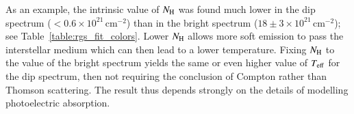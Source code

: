 \documentclass{aa}
\begin{document}
As an example, the intrinsic value of $N_{\rm H}$ was found much lower
in the dip spectrum ($<0.6\times 10^{21}$\,cm$^{-2}$) than in the
bright spectrum ($18\pm 3\times 10^{21}$\,cm$^{-2}$); see Table~\ref{table:rgs_fit_colors}. Lower $N_{\rm H}$
allows more soft emission to pass the interstellar medium which can
then lead to a lower temperature. Fixing $N_{\rm H}$ to the value of
the bright spectrum yields the same or even higher value of $T_{\rm eff}$
for the dip spectrum, then not requiring the conclusion of Compton
rather than Thomson scattering. The result thus depends strongly
on the details of modelling photoelectric absorption.
%

%
%
\end{document}
